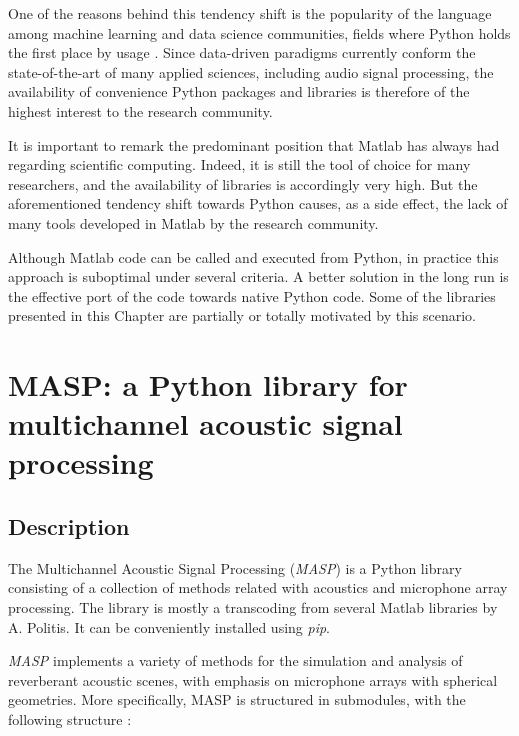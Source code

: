 One of the reasons behind this tendency shift is the popularity of the language among machine learning and data science communities, fields where Python holds the first place by usage \cite{githubblog}. 
Since data-driven paradigms currently conform the state-of-the-art of many applied sciences, including audio signal processing, the availability of convenience Python packages and libraries is therefore of the highest interest to the research community. 

It is important to remark the predominant position that Matlab has always had regarding scientific computing. Indeed, it is still the tool of choice for many researchers, and the availability of libraries is accordingly very high. 
But the aforementioned tendency shift towards Python causes, as a side effect, the lack of many tools developed in Matlab by the research community.

Although Matlab code can be called and executed from Python, in practice this approach is suboptimal under several criteria. A better solution in the long run is the effective port of the code towards native Python code. Some of the libraries presented in this Chapter are partially or totally  motivated by this scenario.

	

\section{MASP: a Python library for multichannel acoustic signal processing}
\label{sec:masp}
\subsection{Description}

The Multichannel Acoustic Signal Processing (\textit{MASP}) is a Python library consisting of a collection of methods related with acoustics and microphone array processing.
The library is mostly a transcoding from several Matlab libraries by A. Politis\cite{politis2016microphone, github_politis}. 
It can be conveniently installed using \textit{pip}.

\textit{MASP} implements a variety of methods for the simulation and analysis of reverberant acoustic scenes, with emphasis on microphone arrays with spherical geometries.
More specifically, MASP is structured in submodules, with the following structure :

